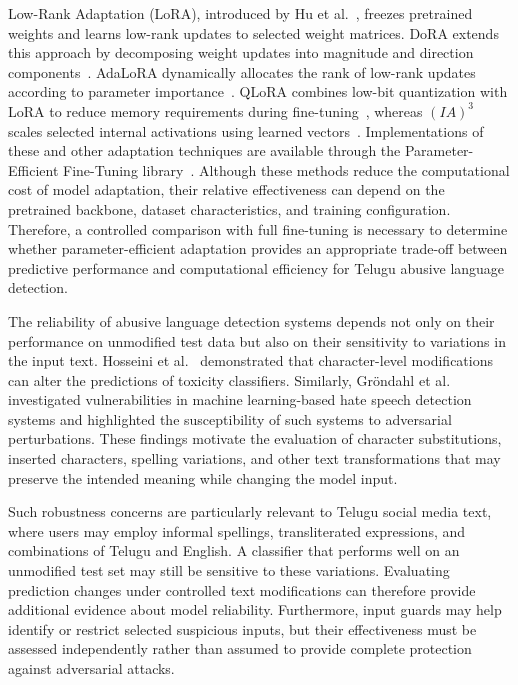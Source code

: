 \documentclass{svproc}
\begin{document}
Low-Rank Adaptation (LoRA), introduced by Hu et al.~\cite{hu2022lora}, freezes pretrained weights and learns low-rank updates to selected weight matrices. DoRA extends this approach by decomposing weight updates into magnitude and direction components~\cite{liu2024dora}. AdaLoRA dynamically allocates the rank of low-rank updates according to parameter importance~\cite{zhang2023adalora}. QLoRA combines low-bit quantization with LoRA to reduce memory requirements during fine-tuning~\cite{dettmers2023qlora}, whereas $(IA)^3$ scales selected internal activations using learned vectors~\cite{liu2022ia3}. Implementations of these and other adaptation techniques are available through the Parameter-Efficient Fine-Tuning library~\cite{mangrulkar2022peft}. Although these methods reduce the computational cost of model adaptation, their relative effectiveness can depend on the pretrained backbone, dataset characteristics, and training configuration. Therefore, a controlled comparison with full fine-tuning is necessary to determine whether parameter-efficient adaptation provides an appropriate trade-off between predictive performance and computational efficiency for Telugu abusive language detection.

The reliability of abusive language detection systems depends not only on their performance on unmodified test data but also on their sensitivity to variations in the input text. Hosseini et al.~\cite{hosseini2017} demonstrated that character-level modifications can alter the predictions of toxicity classifiers. Similarly, Gr\"ondahl et al.~\cite{grondahl2018} investigated vulnerabilities in machine learning-based hate speech detection systems and highlighted the susceptibility of such systems to adversarial perturbations. These findings motivate the evaluation of character substitutions, inserted characters, spelling variations, and other text transformations that may preserve the intended meaning while changing the model input.

Such robustness concerns are particularly relevant to Telugu social media text, where users may employ informal spellings, transliterated expressions, and combinations of Telugu and English. A classifier that performs well on an unmodified test set may still be sensitive to these variations. Evaluating prediction changes under controlled text modifications can therefore provide additional evidence about model reliability. Furthermore, input guards may help identify or restrict selected suspicious inputs, but their effectiveness must be assessed independently rather than assumed to provide complete protection against adversarial attacks.
\end{document}
